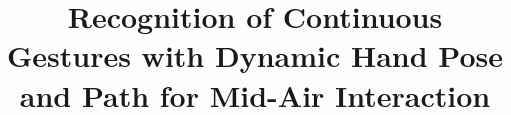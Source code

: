 \documentclass{acm_proc_article-sp}
\begin{document}
%

\title{Recognition of Continuous Gestures with Dynamic Hand Pose and Path for
Mid-Air Interaction}
%
%
%
%
%

%
\author{
%
%
\alignauthor
\alignauthor
}
\end{document}
